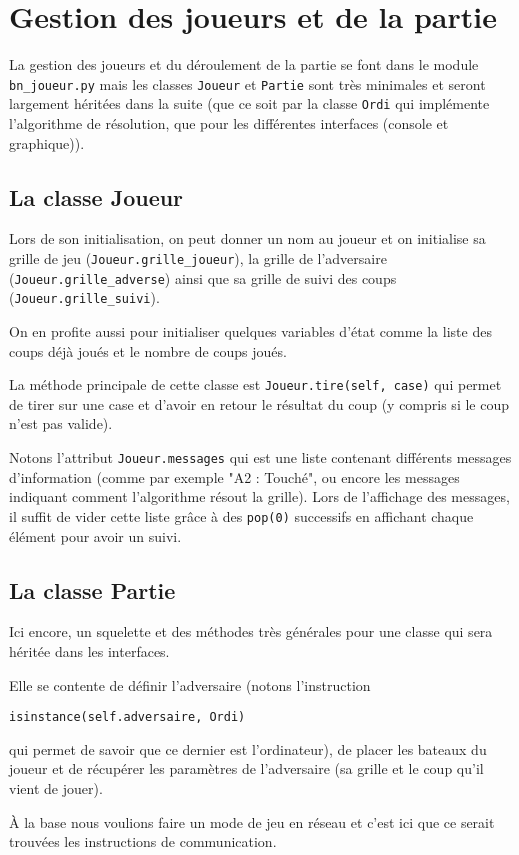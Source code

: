 \chapter{Gestion des joueurs et de la partie}

La gestion des joueurs et du déroulement de la partie se font dans le module \texttt{bn\_joueur.py} mais les classes \texttt{Joueur} et \texttt{Partie} sont très minimales et seront largement héritées dans la suite (que ce soit par la classe \texttt{Ordi} qui implémente l'algorithme de résolution, que pour les différentes interfaces (console et graphique)).

\section{La classe Joueur}
Lors de son initialisation, on peut donner un nom au joueur et on initialise sa grille de jeu (\texttt{Joueur.grille\_joueur}), la grille de l'adversaire (\texttt{Joueur.grille\_adverse}) ainsi que sa grille de suivi des coups (\texttt{Joueur.grille\_suivi}).

On en profite aussi pour initialiser quelques variables d'état comme la liste des coups déjà joués et le nombre de coups joués.

La méthode principale de cette classe est \texttt{Joueur.tire(self, case)} qui permet de tirer sur une case et d'avoir en retour le résultat du coup (y compris si le coup n'est pas valide).

Notons l'attribut \texttt{Joueur.messages} qui est une liste contenant différents messages d'information (comme par exemple "A2 : Touché", ou encore les messages indiquant comment l'algorithme résout la grille). Lors de l'affichage des messages, il suffit de vider cette liste grâce à des \texttt{pop(0)} successifs en affichant chaque élément pour avoir un suivi.

\section{La classe Partie}
Ici encore, un squelette et des méthodes très générales pour une classe qui sera héritée dans les interfaces.

Elle se contente de définir l'adversaire (notons l'instruction \begin{center}
\texttt{isinstance(self.adversaire, Ordi)}
\end{center} qui permet de savoir que ce dernier est l'ordinateur), de placer les bateaux du joueur et de récupérer les paramètres de l'adversaire (sa grille et le coup qu'il vient de jouer).

À la base nous voulions faire un mode de jeu en réseau et c'est ici que ce serait trouvées les instructions de communication.
